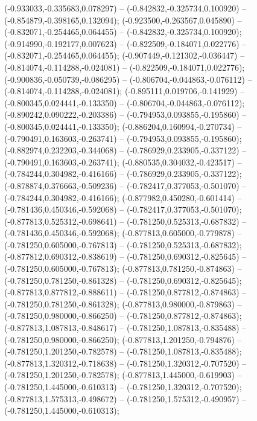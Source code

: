  (-0.933033,-0.335683,0.078297) -- (-0.842832,-0.325734,0.100920) -- (-0.854879,-0.398165,0.132094);
 (-0.923500,-0.263567,0.045890) -- (-0.832071,-0.254465,0.064455) -- (-0.842832,-0.325734,0.100920);
 (-0.914990,-0.192177,0.007623) -- (-0.822509,-0.184071,0.022776) -- (-0.832071,-0.254465,0.064455);
 (-0.907449,-0.121302,-0.036447) -- (-0.814074,-0.114288,-0.024081) -- (-0.822509,-0.184071,0.022776);
 (-0.900836,-0.050739,-0.086295) -- (-0.806704,-0.044863,-0.076112) -- (-0.814074,-0.114288,-0.024081);
 (-0.895111,0.019706,-0.141929) -- (-0.800345,0.024441,-0.133350) -- (-0.806704,-0.044863,-0.076112);
 (-0.890242,0.090222,-0.203386) -- (-0.794953,0.093855,-0.195860) -- (-0.800345,0.024441,-0.133350);
 (-0.886204,0.160994,-0.270734) -- (-0.790491,0.163603,-0.263741) -- (-0.794953,0.093855,-0.195860);
 (-0.882974,0.232203,-0.344068) -- (-0.786929,0.233905,-0.337122) -- (-0.790491,0.163603,-0.263741);
 (-0.880535,0.304032,-0.423517) -- (-0.784244,0.304982,-0.416166) -- (-0.786929,0.233905,-0.337122);
 (-0.878874,0.376663,-0.509236) -- (-0.782417,0.377053,-0.501070) -- (-0.784244,0.304982,-0.416166);
 (-0.877982,0.450280,-0.601414) -- (-0.781436,0.450346,-0.592068) -- (-0.782417,0.377053,-0.501070);
 (-0.877813,0.525312,-0.698641) -- (-0.781250,0.525313,-0.687832) -- (-0.781436,0.450346,-0.592068);
 (-0.877813,0.605000,-0.779878) -- (-0.781250,0.605000,-0.767813) -- (-0.781250,0.525313,-0.687832);
 (-0.877812,0.690312,-0.838619) -- (-0.781250,0.690312,-0.825645) -- (-0.781250,0.605000,-0.767813);
 (-0.877813,0.781250,-0.874863) -- (-0.781250,0.781250,-0.861328) -- (-0.781250,0.690312,-0.825645);
 (-0.877813,0.877812,-0.888611) -- (-0.781250,0.877812,-0.874863) -- (-0.781250,0.781250,-0.861328);
 (-0.877813,0.980000,-0.879863) -- (-0.781250,0.980000,-0.866250) -- (-0.781250,0.877812,-0.874863);
 (-0.877813,1.087813,-0.848617) -- (-0.781250,1.087813,-0.835488) -- (-0.781250,0.980000,-0.866250);
 (-0.877813,1.201250,-0.794876) -- (-0.781250,1.201250,-0.782578) -- (-0.781250,1.087813,-0.835488);
 (-0.877813,1.320312,-0.718638) -- (-0.781250,1.320312,-0.707520) -- (-0.781250,1.201250,-0.782578);
 (-0.877813,1.445000,-0.619903) -- (-0.781250,1.445000,-0.610313) -- (-0.781250,1.320312,-0.707520);
 (-0.877813,1.575313,-0.498672) -- (-0.781250,1.575312,-0.490957) -- (-0.781250,1.445000,-0.610313);
